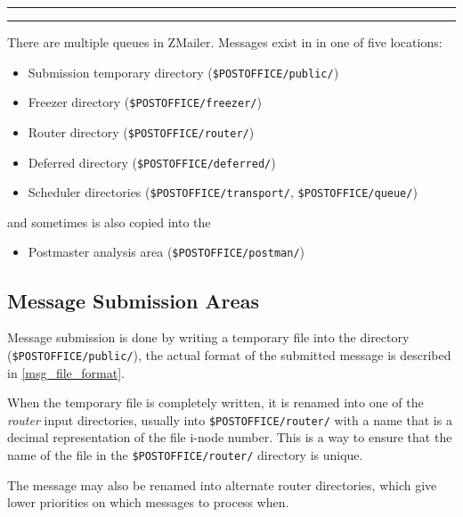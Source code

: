 

\begin{figure*}[ht]
\hrule\medskip
{}
\medskip\hrule\medskip
\end{figure*}

There are multiple queues in ZMailer. Messages exist in
in one of five locations:

\begin{itemize}\sloppy
\item
Submission temporary directory ({\tt \$POSTOFFICE/public/})
\item
Freezer directory ({\tt \$POSTOFFICE/freezer/})
\item
Router directory ({\tt \$POSTOFFICE/router/})
\item
Deferred directory ({\tt \$POSTOFFICE/deferred/})
\item
Scheduler directories ({\tt \$POSTOFFICE/transport/}, 
{\tt \$POSTOFFICE/queue/})
\end{itemize}

and sometimes is also copied into the 
\begin{itemize}
\item Postmaster analysis area ({\small\tt \$POSTOFFICE/postman/})
\end{itemize}



\subsection{Message Submission Areas}



Message submission is done by writing a temporary file
into the directory ({\tt \$POSTOFFICE/public/}), the 
actual format of the submitted message is described in
\vref{msg_file_format}.

When the temporary file is completely written, it is renamed into one 
of the {\em router} input directories, usually into 
{\tt \$POSTOFFICE/router/} with a name that is a decimal representation
of the file i-node number. This is a way to ensure that the
name of the file in the {\tt \$POSTOFFICE/router/} directory is unique.

The message may also be renamed into alternate router directories, 
which give lower priorities on which messages to process when.

